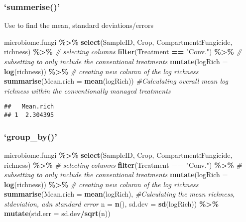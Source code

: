\documentclass[
]{article}
\newenvironment{Shaded}{\begin{snugshade}}{\end{snugshade}}
\newcommand{\AttributeTok}[1]{\textcolor[rgb]{0.13,0.29,0.53}{#1}}
\newcommand{\CommentTok}[1]{\textcolor[rgb]{0.56,0.35,0.01}{\textit{#1}}}
\newcommand{\FunctionTok}[1]{\textcolor[rgb]{0.13,0.29,0.53}{\textbf{#1}}}
\newcommand{\NormalTok}[1]{#1}
\newcommand{\SpecialCharTok}[1]{\textcolor[rgb]{0.81,0.36,0.00}{\textbf{#1}}}
\newcommand{\StringTok}[1]{\textcolor[rgb]{0.31,0.60,0.02}{#1}}
\begin{document}
\subsubsection{`summerise()'}\label{summerise}

Use to find the mean, standard deviations/errors

\begin{Shaded}
\begin{Highlighting}[]
\NormalTok{microbiome.fungi }\SpecialCharTok{\%\textgreater{}\%}
  \FunctionTok{select}\NormalTok{(SampleID, Crop, Compartment}\SpecialCharTok{:}\NormalTok{Fungicide, richness) }\SpecialCharTok{\%\textgreater{}\%}  \CommentTok{\# selecting columns}
  \FunctionTok{filter}\NormalTok{(Treatment }\SpecialCharTok{==} \StringTok{"Conv."}\NormalTok{) }\SpecialCharTok{\%\textgreater{}\%}  \CommentTok{\# subsetting to only include the conventional treatments}
  \FunctionTok{mutate}\NormalTok{(}\AttributeTok{logRich =} \FunctionTok{log}\NormalTok{(richness)) }\SpecialCharTok{\%\textgreater{}\%}  \CommentTok{\# creating new column of the log richness}
  \FunctionTok{summarise}\NormalTok{(}\AttributeTok{Mean.rich =} \FunctionTok{mean}\NormalTok{(logRich))  }\CommentTok{\#Calculating overall mean log richness within the conventionally managed treatments }
\end{Highlighting}
\end{Shaded}

\begin{verbatim}
##   Mean.rich
## 1  2.304395
\end{verbatim}

\subsubsection{`group\_by()'}\label{group_by}

\begin{Shaded}
\begin{Highlighting}[]
\NormalTok{microbiome.fungi }\SpecialCharTok{\%\textgreater{}\%}
  \FunctionTok{select}\NormalTok{(SampleID, Crop, Compartment}\SpecialCharTok{:}\NormalTok{Fungicide, richness) }\SpecialCharTok{\%\textgreater{}\%}  \CommentTok{\# selecting columns}
  \FunctionTok{filter}\NormalTok{(Treatment }\SpecialCharTok{==} \StringTok{"Conv."}\NormalTok{) }\SpecialCharTok{\%\textgreater{}\%}  \CommentTok{\# subsetting to only include the conventional treatments}
  \FunctionTok{mutate}\NormalTok{(}\AttributeTok{logRich =} \FunctionTok{log}\NormalTok{(richness)) }\SpecialCharTok{\%\textgreater{}\%}  \CommentTok{\# creating new column of the log richness}
  \FunctionTok{summarise}\NormalTok{(}\AttributeTok{Mean.rich =} \FunctionTok{mean}\NormalTok{(logRich),  }\CommentTok{\#Calculating the mean richness, stdeviation, adn standard error}
            \AttributeTok{n =} \FunctionTok{n}\NormalTok{(),}
            \AttributeTok{sd.dev =} \FunctionTok{sd}\NormalTok{(logRich)) }\SpecialCharTok{\%\textgreater{}\%} 
  \FunctionTok{mutate}\NormalTok{(}\AttributeTok{std.err =}\NormalTok{ sd.dev}\SpecialCharTok{/}\FunctionTok{sqrt}\NormalTok{(n))}
\end{Highlighting}
\end{Shaded}
\end{document}
